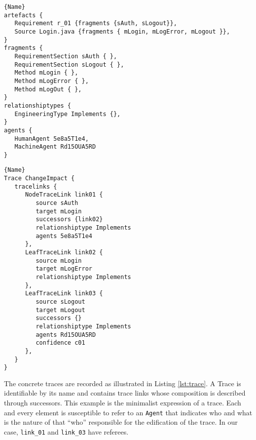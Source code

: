 \lstset{style=mystyle}
\noindent\begin{minipage}[t]{.45\textwidth}
\begin{lstlisting}[caption={Artefacts, Fragments, Relationships, and Agents declaration},frame=tlrb,label=lst:declare]{Name}
artefacts {
   Requirement r_01 {fragments {sAuth, sLogout}},
   Source Login.java {fragments { mLogin, mLogError, mLogout }},
}
fragments {
   RequirementSection sAuth { },
   RequirementSection sLogout { },
   Method mLogin { },
   Method mLogError { },
   Method mLogOut { },
}
relationshiptypes {
   EngineeringType Implements {},
}
agents {
   HumanAgent 5e8a5T1e4,
   MachineAgent Rd15OUA5RD 
}
\end{lstlisting}
\end{minipage}\hfill
\begin{minipage}[t]{.45\textwidth}
\begin{lstlisting}[caption={Trace instance},frame=tlrb,label=lst:trace]{Name}
Trace ChangeImpact {
   tracelinks {  
      NodeTraceLink link01 { 
         source sAuth
         target mLogin
         successors {link02}
         relationshiptype Implements  
         agents 5e8a5T1e4
      },
      LeafTraceLink link02 { 
         source mLogin
         target mLogError
         relationshiptype Implements  
      },
      LeafTraceLink link03 { 
         source sLogout
         target mLogout
         successors {}
         relationshiptype Implements  
         agents Rd15OUA5RD
         confidence c01
      },
   }
}
\end{lstlisting}
\end{minipage}



The concrete traces are recorded as illustrated in Listing \ref{lst:trace}. A Trace is identifiable by its name and contains trace links whose composition is described through successors. This example is the minimalist expression of a trace. Each and every element is susceptible to refer to an \texttt{Agent} that indicates who and what is the nature of that “who” responsible for the edification of the trace. In our case, \texttt{link\_01} and \texttt{link\_03} have referees.

